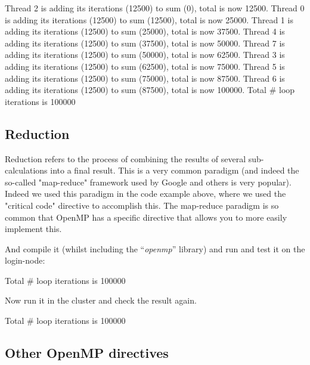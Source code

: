 \begin{prompt}
Thread 2 is adding its iterations (12500) to sum (0), total is now 12500.
Thread 0 is adding its iterations (12500) to sum (12500), total is now 25000.
Thread 1 is adding its iterations (12500) to sum (25000), total is now 37500.
Thread 4 is adding its iterations (12500) to sum (37500), total is now 50000.
Thread 7 is adding its iterations (12500) to sum (50000), total is now 62500.
Thread 3 is adding its iterations (12500) to sum (62500), total is now 75000.
Thread 5 is adding its iterations (12500) to sum (75000), total is now 87500.
Thread 6 is adding its iterations (12500) to sum (87500), total is now 100000.
Total # loop iterations is 100000
\end{prompt}

\subsection{Reduction}

Reduction refers to the process of combining the results of several
sub-calculations into a final result. This is a very common paradigm (and
indeed the so-called "map-reduce" framework used by Google and others is very
popular). Indeed we used this paradigm in the code example above, where we used
the "critical code" directive to accomplish this. The map-reduce paradigm is so
common that OpenMP has a specific directive that allows you to more easily
implement this.


And compile it (whilst including the ``\emph{openmp}'' library) and run and
test it on the login-node:

\begin{prompt}
Total # loop iterations is 100000
\end{prompt}

Now run it in the cluster and check the result again.

\begin{prompt}
Total # loop iterations is 100000
\end{prompt}

\subsection{Other OpenMP directives}

